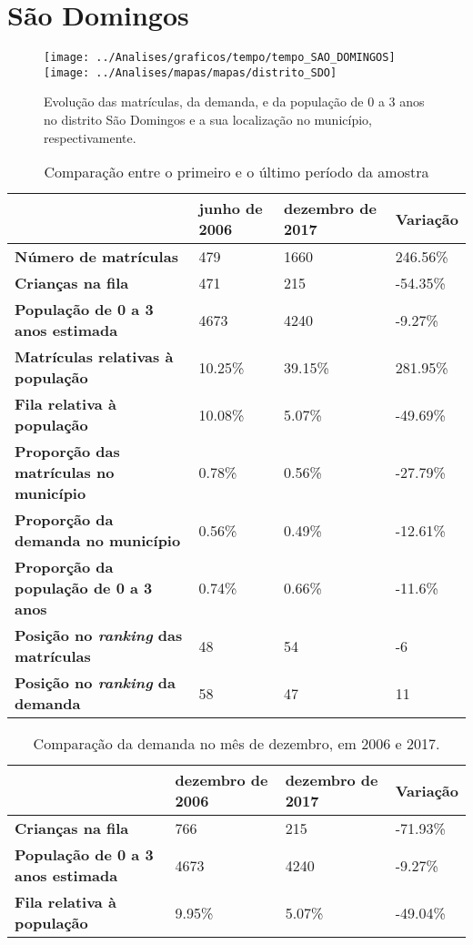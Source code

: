 \section{São Domingos}
\begin{figure}[H]
\centering
\texttt{[image: ../Analises/graficos/tempo/tempo\_SAO\_DOMINGOS]}
\texttt{[image: ../Analises/mapas/mapas/distrito\_SDO]}
\caption{Evolução das matrículas, da demanda, e da população de 0 a 3 anos no distrito São Domingos e a sua localização no município, respectivamente.}
\end{figure}
\begin{table}[H]
\begin{tabular}{l|l|l|l}
\textbf{}                                      & \textbf{junho de 2006}       & \textbf{dezembro de 2017}    & \textbf{Variação} \\ \hline
\textbf{Número de matrículas}                  & 479 & 1660 & 246.56\% \\ \hline
\textbf{Crianças na fila}                      & 471 & 215 & -54.35\% \\ \hline
\textbf{População de 0 a 3 anos estimada}      & 4673 & 4240 & -9.27\% \\ \hline
\textbf{Matrículas relativas à população}      & 10.25\% & 39.15\% & 281.95\% \\ \hline
\textbf{Fila relativa à população}             & 10.08\% & 5.07\% & -49.69\% \\ \hline
\textbf{Proporção das matrículas no município} & 0.78\% & 0.56\% & -27.79\% \\ \hline
\textbf{Proporção da demanda no município}     & 0.56\% & 0.49\% & -12.61\% \\ \hline
\textbf{Proporção da população de 0 a 3 anos}  & 0.74\% & 0.66\% & -11.6\% \\ \hline
\textbf{Posição no \textit{ranking} das matrículas}     & 48 & 54 & -6 \\ \hline
\textbf{Posição no \textit{ranking} da demanda}         & 58 & 47 & 11 \\ 
\end{tabular}
\caption{Comparação entre o primeiro e o último período da amostra}
\end{table}
\begin{table}[H]
\begin{tabular}{l|l|l|l}
\textbf{}                                 & \textbf{dezembro de 2006} & \textbf{dezembro de 2017} & \textbf{Variação} \\ \hline
\textbf{Crianças na fila}                      & 766 & 215 & -71.93\% \\ \hline
\textbf{População de 0 a 3 anos estimada}      & 4673 & 4240 & -9.27\% \\ \hline
\textbf{Fila relativa à população}             & 9.95\% & 5.07\% & -49.04\% \\
\end{tabular}
\caption{Comparação da demanda no mês de dezembro, em 2006 e 2017.}
\end{table}
